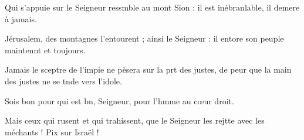 \item Qui s’appuie sur le Seigneur ressmble au mont Sion :\psstar{} il est inébranlable, il demere à jamais.
\item Jérusalem, des montagnes l’entourent ;\pscross{} ainsi le Seigneur : il entore son peuple\psstar{} maintennt et toujours.
\item Jamais le sceptre de l’impie ne pèsera sur la prt des justes,\psstar{} de peur que la main des justes ne se tnde vers l’idole.
\item Sois bon pour qui est bn, Seigneur,\psstar{} pour l’hmme au cœur droit.
\item Mais ceux qui rusent et qui trahissent,\pscross{} que le Seigneur les rejtte avec les méchants !\psstar{} Pix sur Israël !